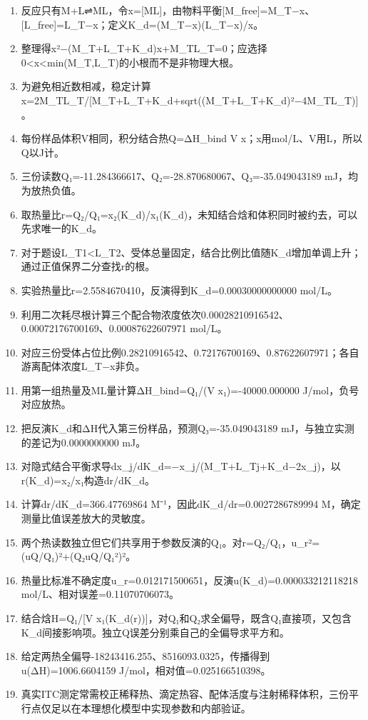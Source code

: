 \documentclass[UTF8,11pt,a4paper]{ctexart}
\begin{document}
\begin{enumerate}
\item 反应只有M+L⇌ML，令x=[ML]，由物料平衡[M\_free]=M\_T−x、[L\_free]=L\_T−x；定义K\_d=(M\_T−x)(L\_T−x)/x。
\item 整理得x²−(M\_T+L\_T+K\_d)x+M\_TL\_T=0；应选择0<x<min(M\_T,L\_T)的小根而不是非物理大根。
\item 为避免相近数相减，稳定计算x=2M\_TL\_T/[M\_T+L\_T+K\_d+sqrt((M\_T+L\_T+K\_d)²−4M\_TL\_T)]。
\item 每份样品体积V相同，积分结合热Q=ΔH\_bind V x；x用mol/L、V用L，所以Q以J计。
\item 三份读数Q₁=-11.284366617、Q₂=-28.870680067、Q₃=-35.049043189 mJ，均为放热负值。
\item 取热量比r=Q₂/Q₁=x₂(K\_d)/x₁(K\_d)，未知结合焓和体积同时被约去，可以先求唯一的K\_d。
\item 对于题设L\_T1<L\_T2、受体总量固定，结合比例比值随K\_d增加单调上升；通过正值保界二分查找r的根。
\item 实验热量比r=2.5584670410，反演得到K\_d=0.00030000000000 mol/L。
\item 利用二次耗尽根计算三个配合物浓度依次0.00028210916542、0.00072176700169、0.00087622607971 mol/L。
\item 对应三份受体占位比例0.28210916542、0.72176700169、0.87622607971；各自游离配体浓度L\_T−x非负。
\item 用第一组热量及ML量计算ΔH\_bind=Q₁/(V x₁)=-40000.000000 J/mol，负号对应放热。
\item 把反演K\_d和ΔH代入第三份样品，预测Q₃=-35.049043189 mJ，与独立实测的差记为0.0000000000 mJ。
\item 对隐式结合平衡求导dx\_j/dK\_d=−x\_j/(M\_T+L\_Tj+K\_d−2x\_j)，以r(K\_d)=x₂/x₁构造dr/dK\_d。
\item 计算dr/dK\_d=366.47769864 M⁻¹，因此dK\_d/dr=0.0027286789994 M，确定测量比值误差放大的灵敏度。
\item 两个热读数独立但它们共享用于参数反演的Q₁。对r=Q₂/Q₁，u\_r²=(uQ/Q₁)²+(Q₂uQ/Q₁²)²。
\item 热量比标准不确定度u\_r=0.012171500651，反演u(K\_d)=0.000033212118218 mol/L、相对误差=0.11070706073。
\item 结合焓H=Q₁/[V x₁(K\_d(r))]，对Q₁和Q₂求全偏导，既含Q₁直接项，又包含K\_d间接影响项。独立Q误差分别乘自己的全偏导求平方和。
\item 给定两热全偏导-18243416.255、8516093.0325，传播得到u(ΔH)=1006.6604159 J/mol，相对值=0.025166510398。
\item 真实ITC测定常需校正稀释热、滴定热容、配体活度与注射稀释体积，三份平行点仅足以在本理想化模型中实现参数和内部验证。
\end{enumerate}
\end{document}
